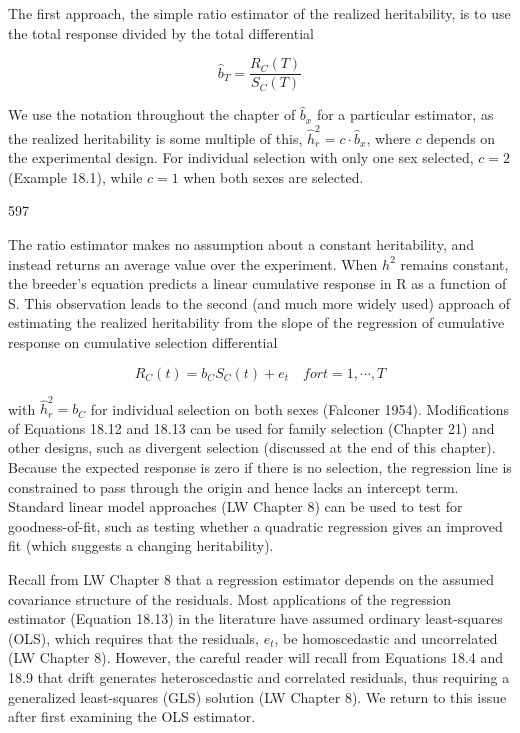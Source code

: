 \documentclass{article}
\begin{document}
The first approach, the simple ratio estimator of the realized heritability, is to use the total response divided by the total differential

\begin{equation}
\widehat{b}_{T}=\frac{R_{C}(T)}{S_{C}(T)}
\tag{18.12}
\label{eq:18_12}
\end{equation}

We use the notation throughout the chapter of  $ \hat{b}_x $ for a particular estimator, as the realized heritability is some multiple of this,  $ \hat{h}_r^2 = c \cdot \hat{b}_x $, where  $ c $ depends on the experimental design. For individual selection with only one sex selected,  $ c = 2 $ (Example 18.1), while  $ c = 1 $ when both sexes are selected.

597

The ratio estimator makes no assumption about a constant heritability, and instead returns an average value over the experiment. When  $ h^{2} $ remains constant, the breeder's equation predicts a linear cumulative response in R as a function of S. This observation leads to the second (and much more widely used) approach of estimating the realized heritability from the slope of the regression of cumulative response on cumulative selection differential

\begin{equation}
R_{C}(t)=b_{C}S_{C}(t)+e_{t}\quad for t=1,\cdots,T
\tag{18.13}
\label{eq:18_13}
\end{equation}

with  $ \hat{h}_{r}^{2}=b_{C} $ for individual selection on both sexes (Falconer 1954). Modifications of Equations 18.12 and 18.13 can be used for family selection (Chapter 21) and other designs, such as divergent selection (discussed at the end of this chapter). Because the expected response is zero if there is no selection, the regression line is constrained to pass through the origin and hence lacks an intercept term. Standard linear model approaches (LW Chapter 8) can be used to test for goodness-of-fit, such as testing whether a quadratic regression gives an improved fit (which suggests a changing heritability).

Recall from LW Chapter 8 that a regression estimator depends on the assumed covariance structure of the residuals. Most applications of the regression estimator (Equation 18.13) in the literature have assumed ordinary least-squares (OLS), which requires that the residuals,  $ e_{t} $, be homoscedastic and uncorrelated (LW Chapter 8). However, the careful reader will recall from Equations 18.4 and 18.9 that drift generates heteroscedastic and correlated residuals, thus requiring a generalized least-squares (GLS) solution (LW Chapter 8). We return to this issue after first examining the OLS estimator.
\end{document}
